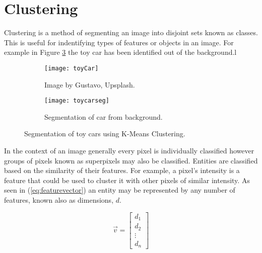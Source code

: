 \section{Clustering}
Clustering is a method of segmenting an image into disjoint sets known as classes. This is useful for indentifying types of features or objects in an image. For example in Figure \ref{fig:toycar} the toy car has been identified out of the background.l

\begin{figure}[H]
	\centering
	\begin{subfigure}[b]{0.5\linewidth}
      		\centering\texttt{[image: toyCar]}
      		\caption{Image by Gustavo, Upsplash.}
		    \label{fig:toycarA}
    	\end{subfigure}%
    	\begin{subfigure}[b]{0.5\linewidth}
      		\centering\texttt{[image: toycarseg]}
      		\caption{Segmentation of car from background.}
       		\label{fig:toycarB}
    	\end{subfigure}
    	\caption{Segmentation of toy cars using K-Means Clustering.}
    	\label{fig:toycar}
\end{figure} 

In the context of an image generally every pixel is individually classified however groups of pixels known as superpixels may also be classified. Entities are classified based on the similarity of their features. For example, a pixel's intensity is a feature that could be used to cluster it with other pixels of similar intensity. As seen in (\ref{eq:featurevector}) an entity may be represented by any number of features, known also as dimensions, $d$. 

\begin{equation}
    \vec{v} = 
    \begin{bmatrix}
        d_1 \\
        d_2 \\
        \vdots \\ 
        d_n
    \end{bmatrix}
    \label{eq:featurevector}
\end{equation}





